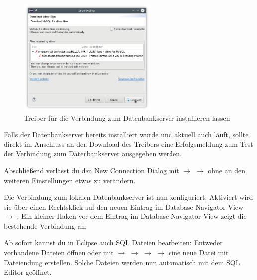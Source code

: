 \begin{figure}[h]
  \centering
   \includegraphics[width=0.6\textwidth]{./inf/SEKII/01_Vorbereitung/dbeaver_download_driver.png}
   \caption{Treiber für die Verbindung zum Datenbankserver installieren lassen}
   \label{fig:dbeaver_download_driver}
\end{figure}

Falls der Datenbankserver bereits installiert wurde und aktuell auch läuft, sollte 
direkt im Anschluss an den Download des Treibers eine Erfolgsmeldung zum Test der 
Verbindung zum Datenbankserver ausgegeben werden.

Abschließend verlässt du den New Connection Dialog mit  $\rightarrow$ 
 $\rightarrow$  ohne an den weiteren Einstellungen etwas zu 
verändern.

Die Verbindung zum lokalen Datenbankserver ist nun konfiguriert. Aktiviert wird sie
über einen Rechtsklick auf den neuen Eintrag im Database Navigator View $\rightarrow$ 
. Ein kleiner Haken vor dem Eintrag im Database Navigator View zeigt
die bestehende Verbindung an.

Ab sofort kannst du in Eclipse auch SQL Dateien bearbeiten: Entweder vorhandene Dateien 
öffnen oder mit  $\rightarrow$  $\rightarrow$
 $\rightarrow$  $\rightarrow$ 
 eine neue Datei mit Dateiendung  erstellen.
Solche Dateien werden nun automatisch mit dem SQL Editor geöffnet.

